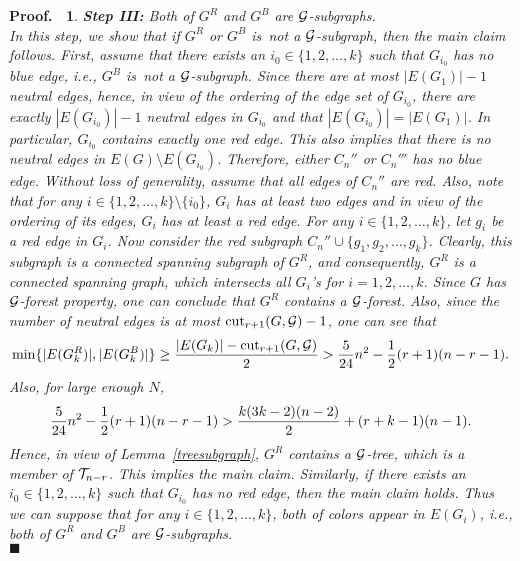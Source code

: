 \documentclass[11pt]{article}
\newtheorem{preproof}{{\bf Proof.\ }}
\newenvironment{proof}[1]{\begin{preproof}{\rm
               #1}\hfill{$\blacksquare$}}{\end{preproof}}
\begin{document}
\begin{proof}
{%
{\bf Step III:} Both of $G^R$ and $G^B$ are ${\cal G}$-subgraphs.\\
In this step, we show that if $G^R$ or $G^B$ is~not a ${\cal G}$-subgraph, then the main claim follows. 
First, assume that there exists an $i_0\in\{1,2,\ldots,k\}$ such that $G_{i_0}$ has no blue 
edge, i.e., $G^B$ is~not a ${\cal G}$-subgraph. 
Since there are at most $|E(G_1)|-1$ neutral edges, hence, in view of the ordering of the edge set of $G_{i_0}$, there are   
exactly $|E(G_{i_0})|-1$ neutral edges in $G_{i_0}$ and that $|E(G_{i_0})|=|E(G_{1})|$. In particular, $G_{i_0}$ contains exactly 
one red edge. This also 
implies that there is no neutral edges in $E(G)\setminus E(G_{i_0})$. 
Therefore,  either $C_n''$ or $C_n'''$ has no blue edge.
Without loss of generality, assume that all edges of $C_n''$ are red.  Also, 
note that for any 
$i\in\{1,2,\ldots,k\}\setminus\{i_0\}$, $G_i$ has at least two edges and in view of the ordering of its edges, $G_i$ has at least a red edge. 
For any $i\in\{1,2,\ldots,k\}$, let $g_i$ be a red edge in $G_i$. 
Now consider the red subgraph $C_n''\cup\{g_1,g_2,\ldots,g_{k}\}$.
Clearly, this subgraph is a connected spanning subgraph of $G^R$, and 
consequently, $G^R$ is a connected spanning graph, which intersects all $G_i$'s for $i=1,2,\ldots,k$. 
Since $G$ has ${\cal G}$-forest  property, one can conclude that $G^R$ contains a  ${\cal G}$-forest. 
Also, since the number of neutral edges is at most ${\rm cut}_{r+1}(G,{\cal G})-1$, 
one can see that 
\begin{equation}\label{coloredges}
\min\{|E(G_k^R)|, |E(G_k^B)|\}\geq {|E(G_k)|-{\rm cut}_{r+1}(G,{\cal G})\over 2}> {5\over 24}n^2-{1\over 2}(r+1)(n-r-1).
\end{equation}
Also, for large enough $N$, 
$${5\over 24}n^2-{1\over 2}(r+1)(n-r-1)> {k(3k-2)(n-2)\over 2}+ (r+k-1)(n-1).$$
Hence, in view of Lemma~\ref{treesubgraph}, $G^R$ contains a ${\cal G}$-tree, which is a member of ${\cal T}_{n-r}$. 
This implies the main claim. Similarly, if there exists an  $i_0\in\{1,2,\ldots,k\}$ such that $G_{i_0}$ has no red 
edge, then the main claim holds. 
Thus we can suppose that for any $i\in\{1,2,\ldots,k\}$, both of colors appear in $E(G_i)$, i.e., 
both of $G^R$ and $G^B$ are ${\cal G}$-subgraphs.\\

}
\end{proof}
\end{document}
